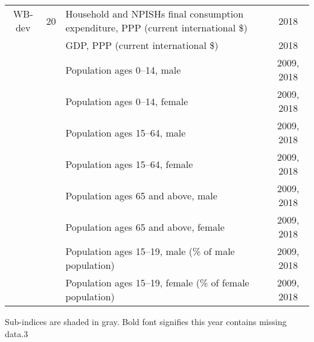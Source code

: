 {\begin{tabular}{cclc}
    WB-dev & 20    & Household and NPISHs final consumption expenditure, PPP (current international \$) & 2018 \\
          &       & GDP, PPP (current international \$) & 2018 \\
          &       & Population ages 0--14, male & 2009, 2018 \\
          &       & Population ages 0--14, female & 2009, 2018 \\
          &       & Population ages 15--64, male & 2009, 2018 \\
          &       & Population ages 15--64, female & 2009, 2018 \\
          &       & Population ages 65 and above, male & 2009, 2018 \\
          &       & Population ages 65 and above, female & 2009, 2018 \\
          &       & Population ages 15--19, male (\% of male population) & 2009, 2018 \\
          &       & Population ages 15--19, female (\% of female population) & 2009, 2018 \\
          \bottomrule
    \end{tabular}
}{Sub-indices are shaded in gray. Bold font signifies this year contains missing data.}{3}
\newpage

